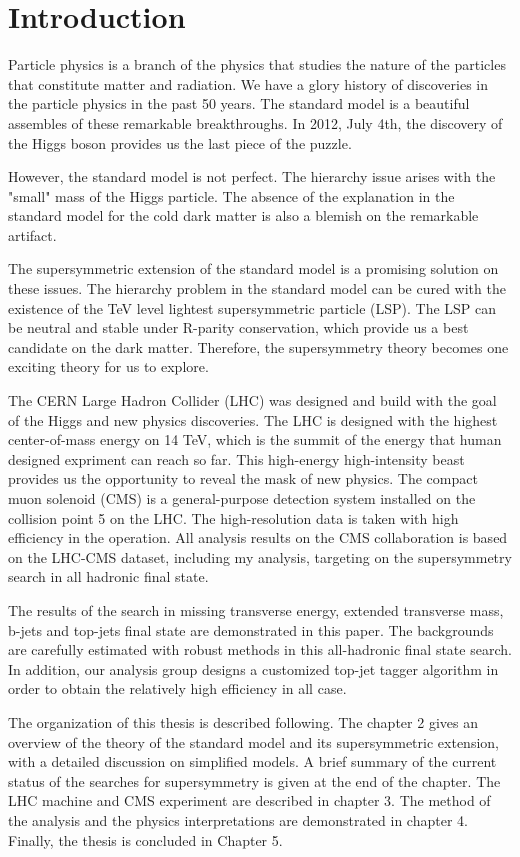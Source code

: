 \chapter{Introduction}
Particle physics is a branch of the physics that studies the nature of the particles that constitute matter and radiation. We have a glory history of discoveries in the particle physics in the past 50 years. The standard model is a beautiful assembles of these remarkable breakthroughs. In 2012, July 4th, the discovery of the Higgs boson provides us the last piece of the puzzle.

However, the standard model is not perfect. The hierarchy issue arises with the "small" mass of the Higgs particle. The absence of the explanation in the standard model for the cold dark matter is also a blemish on the remarkable artifact.

The supersymmetric extension of the standard model is a promising solution on these issues. The hierarchy problem in the standard model can be cured with the existence of the TeV level lightest supersymmetric particle (LSP). The LSP can be neutral and stable under R-parity conservation, which provide us a best candidate on the dark matter. Therefore, the supersymmetry theory becomes one exciting theory for us to explore.

The CERN Large Hadron Collider (LHC) was designed and build with the goal of the Higgs and new physics discoveries. The LHC is designed with the highest center-of-mass energy on 14 TeV, which is the summit of the energy that human designed expriment can reach so far. This high-energy high-intensity beast provides us the opportunity to reveal the mask of new physics. The compact muon solenoid (CMS) is a general-purpose detection system installed on the collision point 5 on the LHC. The high-resolution data is taken with high efficiency in the operation. All analysis results on the CMS collaboration is based on the LHC-CMS dataset, including my analysis, targeting on the supersymmetry search in all hadronic final state.

The results of the search in missing transverse energy, extended transverse mass, b-jets and top-jets final state are demonstrated in this paper. The backgrounds are carefully estimated with robust methods in this all-hadronic final state search. In addition, our analysis group designs a customized top-jet tagger algorithm in order to obtain the relatively high efficiency in all case.

The organization of this thesis is described following. The chapter 2 gives an overview of the theory of the standard model and its supersymmetric extension, with a detailed discussion on simplified models. A brief summary of the current status of the searches for supersymmetry is given at the end of the chapter. The LHC machine and CMS experiment are described in chapter 3. The method of the analysis and the physics interpretations are demonstrated in chapter 4. Finally, the thesis is concluded in Chapter 5.
